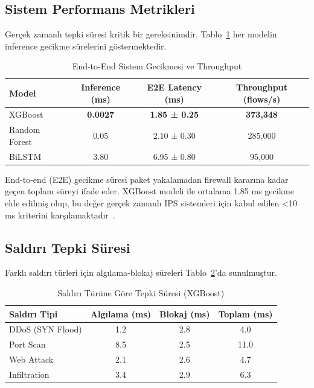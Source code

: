 \subsection{Sistem Performans Metrikleri}

Gerçek zamanlı tepki süresi kritik bir gereksinimdir. Tablo~\ref{tab:latency} her modelin inference gecikme sürelerini göstermektedir.

\begin{table}[h]
\centering
\caption{End-to-End Sistem Gecikmesi ve Throughput}
\label{tab:latency}
\begin{tabular}{lccc}
\hline
\textbf{Model} & \textbf{Inference (ms)} & \textbf{E2E Latency (ms)} & \textbf{Throughput (flows/s)} \\
\hline
XGBoost & \textbf{0.0027} & \textbf{1.85 ± 0.25} & \textbf{373,348} \\
Random Forest & 0.05 & 2.10 ± 0.30 & 285,000 \\
BiLSTM & 3.80 & 6.95 ± 0.80 & 95,000 \\
\hline
\end{tabular}
\end{table}

End-to-end (E2E) gecikme süresi paket yakalamadan firewall kararına kadar geçen toplam süreyi ifade eder. XGBoost modeli ile ortalama 1.85 ms gecikme elde edilmiş olup, bu değer gerçek zamanlı IPS sistemleri için kabul edilen <10 ms kriterini karşılamaktadır~\cite{ips_standards}.

\subsection{Saldırı Tepki Süresi}

Farklı saldırı türleri için algılama-blokaj süreleri Tablo~\ref{tab:response_time}'da sunulmuştur.

\begin{table}[h]
\centering
\caption{Saldırı Türüne Göre Tepki Süresi (XGBoost)}
\label{tab:response_time}
\begin{tabular}{lccc}
\hline
\textbf{Saldırı Tipi} & \textbf{Algılama (ms)} & \textbf{Blokaj (ms)} & \textbf{Toplam (ms)} \\
\hline
DDoS (SYN Flood) & 1.2 & 2.8 & 4.0 \\
Port Scan & 8.5 & 2.5 & 11.0 \\
Web Attack & 2.1 & 2.6 & 4.7 \\
Infiltration & 3.4 & 2.9 & 6.3 \\
\hline
\end{tabular}
\end{table}


